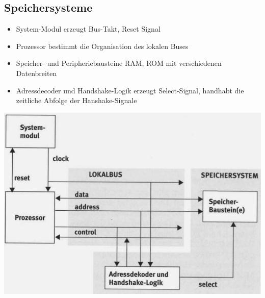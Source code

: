 \clearpage

\begin{minipage}{0.5\linewidth}
    \subsection{Speichersysteme}   
    \begin{itemize}
        \item System-Modul
        \subitem erzeugt Bus-Takt, Reset Signal
        \item Prozessor
        \subitem bestimmt die Organisation des lokalen Buses
        \item Speicher- und Peripheriebausteine
        \subitem RAM, ROM mit verschiedenen Datenbreiten
        \item Adressdecoder und Handshake-Logik
        \subitem erzeugt Select-Signal, handhabt die zeitliche Abfolge der Hanshake-Signale 
    \end{itemize}
\end{minipage}
\begin{minipage}{0.5\linewidth}
    \includegraphics[width=\textwidth]{images/SystembusSpeicherSpeichersystem/SpeicherSysHardwareAuf}
\end{minipage}

